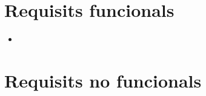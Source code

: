 \section{Requisits funcionals}
\begin{itemize}
  \item{}
\end{itemize}
\section{Requisits no funcionals}
